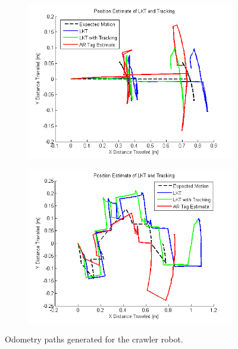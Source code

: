 \documentclass[letterpaper, 10 pt, conference]{ieeeconf}
\begin{document}
\begin{figure}[tb]
	\centering
	\begin{subfigure}{\columnwidth}
		  \centering
		  \includegraphics[width=\columnwidth]{crawler1_path.png}
		  \label{crawler:pattern1_path}
	\end{subfigure}
	\begin{subfigure}{\columnwidth}
		  \centering
		  \includegraphics[width=\columnwidth]{crawler2_path.png}
		  \label{crawler:pattern2_path}
	\end{subfigure}
	\caption{Odometry paths generated for the crawler robot.}
    \label{crawler_path}
\end{figure}
\end{document}
